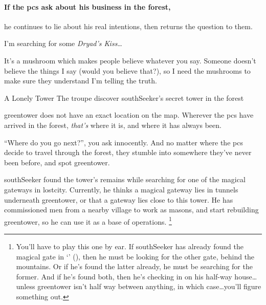 \label{southSmith}
\southSmith

\paragraph{If the \glspl{pc} ask  about his business in the forest,}
he continues to lie about his real intentions, then returns the question to them.

\begin{speechtext}
  I'm searching for some \textit{Dryad's Kiss}\ldots

  It's a mushroom which makes people believe whatever you say.
  Someone doesn't believe the things I say (would you believe that?), so I need the mushrooms to make sure they understand I'm telling the truth.
\end{speechtext}

{A Lonely Tower}%
{The troupe discover \gls{southSeeker}'s secret tower in the forest}%

\label{green_tower_sq}


\Gls{greentower} does not have an exact location on the map.
Wherever the \glspl{pc} have arrived in the forest, \textit{that's} where it is, and where it has always been.

``Where do you go next?'', you ask innocently.
And no matter where the \glspl{pc} decide to travel through the forest, they stumble into somewhere they've never been before, and spot \gls{greentower}.

\begin{exampletext}
  \Gls{southSeeker} found the tower's remains while searching for one of the magical gateways in \gls{lostcity}.
  Currently, he thinks a magical gateway lies in tunnels underneath \gls{greentower}, or that a gateway lies close to this tower.
  He has commissioned men from a nearby \gls{village} to work as masons, and start rebuilding \gls{greentower}, so he can use it as a base of operations.%
  \footnote{You'll have to play this one by ear.
  If \gls{southSeeker} has already found the magical gate in `' (), then he must be looking for the other gate, behind the mountains.
  Or if he's found the latter already, he must be searching for the former.
  And if he's found both, then he's checking in on his half-way house\ldots unless \gls{greentower} isn't half way between anything, in which case\ldots you'll figure something out.}
\end{exampletext}

